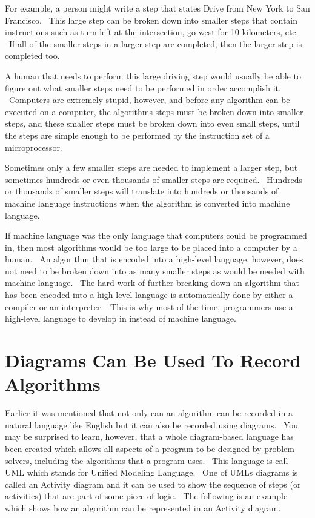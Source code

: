 \documentclass[12pt,twoside]{book}
\begin{document}
\bigskip

For example, a person might write a step that states
{\textquotedbl}Drive from New York to San Francisco.{\textquotedbl}
\ This large step can be broken down into smaller steps that contain
instructions such as {\textquotedbl}turn left at the intersection, go
west for 10 kilometers, etc.{\textquotedbl} \ If all of the smaller
steps in a larger step are completed, then the larger step is completed
too.


\bigskip

A human that needs to perform this large driving step would usually be
able to figure out what smaller steps need to be performed in order
accomplish it. \ Computers are extremely stupid, however, and before
any algorithm can be executed on a computer, the
algorithm{\textquotesingle}s steps must be broken down into smaller
steps, and these smaller steps must be broken down into even small
steps, until the steps are simple enough to be performed by the
instruction set of a microprocessor.


\bigskip

Sometimes only a few smaller steps are needed to implement a larger
step, but sometimes hundreds or even thousands of smaller steps are
required. \ Hundreds or thousands of smaller steps will translate into
hundreds or thousands of machine language instructions when the
algorithm is converted into machine language.


\bigskip

If machine language was the only language that computers could be
programmed in, then most algorithms would be too large to be placed
into a computer by a human. \ An algorithm that is encoded into a
high{}-level language, however, does not need to be broken down into as
many smaller steps as would be needed with machine language. \ The hard
work of further breaking down an algorithm that has been encoded into a
high{}-level language is automatically done by either a compiler or an
interpreter. \ This is why most of the time, programmers use a
high{}-level language to develop in instead of machine language.

\section[Diagrams Can Be Used To Record Algorithms]{
Diagrams Can Be Used To Record Algorithms}

Earlier it was mentioned that not only can an algorithm can be recorded
in a natural language like English but it can also be recorded using
diagrams. \ You may be surprised to learn, however, that a whole
diagram{}-based language has been created which allows all aspects of a
program to be designed by {\textquotesingle}problem
solvers{\textquotesingle}, including the algorithms that a program
uses. \ This language is call UML which stands for Unified Modeling
Language. \ One of UML{\textquotesingle}s diagrams is called an
Activity diagram and it can be used to show the sequence of steps (or
activities) that are part of some piece of logic. \ The following is an
example which shows how an algorithm can be represented in an Activity
diagram.
\end{document}
